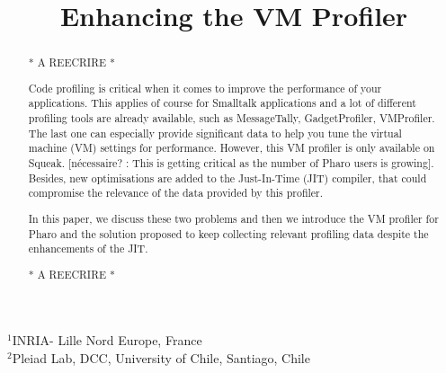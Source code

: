 \documentclass[10pt,reprint]{sigplanconf}
\newcommand{\Title}{Enhancing the VM Profiler}
\newcommand{\Authors}{Sophie Kaleba, Clément Béra, Alexandre Bergel$^3$\\[2 ex]
$^3$Pleiad Lab, DCC, University of Chile}
\begin{document}
\setlength{\pdfpageheight}{\paperheight}
\setlength{\pdfpagewidth}{\paperwidth}



\title{\Title}


           {$^1$INRIA- Lille Nord Europe, France\\
             $^2$Pleiad Lab, DCC, University of Chile, Santiago, Chile}
           {}


\maketitle

\begin{abstract}

* A REECRIRE *

Code profiling is critical when it comes to improve the performance of your applications. This applies of course for Smalltalk applications and a lot of different profiling tools are already available, such as MessageTally, GadgetProfiler, VMProfiler. The last one can especially provide significant data to help you tune the virtual machine (VM) settings for performance.
However, this VM profiler is only available on Squeak. [nécessaire? : This is getting critical as the number of Pharo users is growing]. Besides, new optimisations are added to the Just-In-Time (JIT) compiler, that could compromise the relevance of the data provided by this profiler. 

In this paper, we discuss these two problems and then we introduce the VM profiler for Pharo and the solution proposed to keep collecting relevant profiling data despite the enhancements of the JIT.

* A REECRIRE *

\end{abstract}



\end{document}
